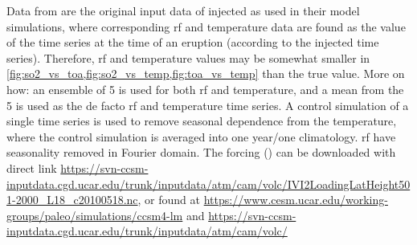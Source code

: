 \documentclass{ametsocV5}
\newcommand{\iso}[1][i]{{#1}njected \ce{SO2}}
\begin{document}
\appendix

\label{app:ob16}

Data from \citet{ottobliesner2016} are the original input data of \iso{} as used in
their model simulations, where corresponding \ac{rf} and temperature data are found as
the value of the time series at the time of an eruption (according to the \iso{} time
series). Therefore, \ac{rf} and temperature values may be somewhat smaller in
\cref{fig:so2_vs_toa,fig:so2_vs_temp,fig:toa_vs_temp} than the true value. More on how:
an ensemble of 5 is used for both \ac{rf} and temperature, and a mean from the 5 is used
as the de facto \ac{rf} and temperature time series. A control simulation of a single
time series is used to remove seasonal dependence from the temperature, where the
control simulation is averaged into one year/one climatology. \ac{rf} have seasonality
removed in Fourier domain. The forcing () can be downloaded with direct link
\url{https://svn-ccsm-inputdata.cgd.ucar.edu/trunk/inputdata/atm/cam/volc/IVI2LoadingLatHeight501-2000_L18_c20100518.nc},
or found at \url{https://www.cesm.ucar.edu/working-groups/paleo/simulations/ccsm4-lm}
and \url{https://svn-ccsm-inputdata.cgd.ucar.edu/trunk/inputdata/atm/cam/volc/}

  \clearpage
\printglossary[type=\acronymtype,title=List of Acronyms]
%
\end{document}
